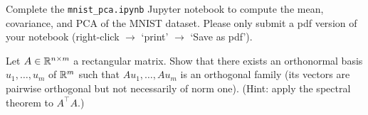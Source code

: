 \documentclass[11pt,nocut]{article}
\begin{document}
\vspace{5mm}

\begin{problem}[3 points]
  Complete the \texttt{mnist\_pca.ipynb} Jupyter notebook to compute the mean, covariance, and PCA of the MNIST dataset.
  Please only submit a pdf version of your notebook (right-click $\to$ `print' $\to$ `Save as pdf').
\end{problem}


\vspace{5mm}

\begin{problem}[$\star$]
  Let $A \in \mathbb{R}^{n \times m}$ a rectangular matrix. Show that there exists an orthonormal basis $u_1, \dots, u_m$ of $\mathbb{R}^m$ such that $Au_1, \dots, Au_m$ is an orthogonal family (its vectors are pairwise orthogonal but not necessarily of norm one). (Hint: apply the spectral theorem to $A^{\top} A$.)
\end{problem}



%
%
\end{document}
